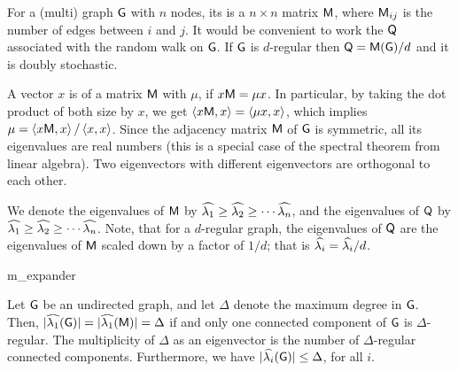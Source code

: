 For a (multi) graph $\mathsf{G}$ with $n$ nodes, its  is a $n\times n$ matrix $\mathsf{M}$, where $\mathsf{M}_{ij}$ is the
number of edges between $i$ and $j$.  It would be convenient to work
the  $\mathsf{Q}$ associated with the random walk
on $\mathsf{G}$. If $\mathsf{G}$ is $d$-regular then $\mathsf{Q} =
\mathsf{M}(\mathsf{G})/d$ and it is doubly stochastic.

A vector $x$ is  of a matrix $\mathsf{M}$ with
 $\mu$, if $x \mathsf{M} = \mu x$. In particular,
by taking the dot product of both size by $x$, we get $\left\langle {{x
   \mathsf{M}},{x}} \right\rangle = \left\langle {{\mu x},{x}} \right\rangle $, which implies $\mu =
\left\langle {{x \mathsf{M}},{x}} \right\rangle/ \left\langle {{ x},{x}} \right\rangle$. Since the adjacency matrix
$\mathsf{M}$ of $\mathsf{G}$ is symmetric, all its eigenvalues are real numbers
(this is a special case of the spectral theorem from linear algebra).
Two eigenvectors with different eigenvectors are orthogonal to each
other.

We denote the eigenvalues of $\mathsf{M}$ by $\widehat{\lambda_{1}} \geq \widehat{\lambda_{2}} \geq
\cdots \widehat{\lambda_{n}}$, and the eigenvalues of $\mathsf{Q}$ by $\widehat{\lambda_{1}}\geq
\widehat{\lambda_{2}} \geq \cdots \widehat{\lambda_{n}}$.  Note, that for a $d$-regular graph, the
eigenvalues of $\mathsf{Q}$ are the eigenvalues of $\mathsf{M}$ scaled down by
a factor of $1/d$; that is $\widehat{\lambda_{i}} = \widehat{\lambda_{i}}/d$.

\begin{fragment}{m_expander}
\begin{lemma}
    Let $\mathsf{G}$ be an undirected graph, and let $\Delta$ denote the
    maximum degree in $\mathsf{G}$. Then,
    $\left| {\smash{\widehat{\lambda_{1}}(\mathsf{G})}} \right| =
    \left| {\smash{\widehat{\lambda_{1}}(\mathsf{M})}} \right|=\Delta$ if and only one connected
    component of $\mathsf{G}$ is $\Delta$-regular. The multiplicity of
    $\Delta$ as an eigenvector is the number of $\Delta$-regular
    connected components. Furthermore, we have
    $\left| {\smash{\widehat{\lambda_{i}}(\mathsf{G})}} \right| \leq \Delta$, for all $i$.

\end{lemma}
\end{fragment}

